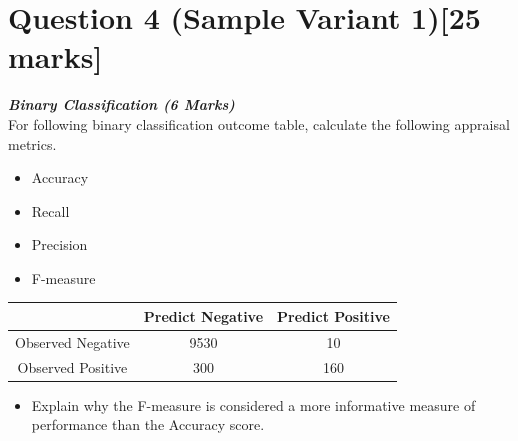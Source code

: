 

\section*{Question 4 (Sample Variant 1)[25 marks]}



\item[(b)] \textbf{\textit{Binary Classification (6 Marks)}}\\
For following binary classification outcome table, calculate the following appraisal metrics.
\begin{itemize}
\item[(i)] Accuracy
\item[(ii)] Recall
\item[(iii)] Precision
\item[(iv)] F-measure
\end{itemize}

\begin{center}
\begin{tabular}{|c|c|c|}
\hline  & \phantom{spa}Predict Negative\phantom{spa} & \phantom{spa}Predict Positive\phantom{spa} \\ 
\hline\phantom{spa} Observed Negative \phantom{spa}&9530&10\\ 
\hline \phantom{spa}Observed Positive\phantom{spa} & 300&160\\ 
\hline 
\end{tabular} 
\end{center}

\begin{itemize}
\item[(v)]  Explain why the F-measure is considered a more informative measure of performance than the Accuracy score.
\end{itemize}
